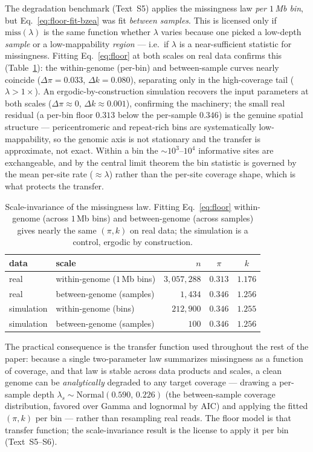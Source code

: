 \documentclass[11pt]{article}
\newcommand{\miss}{\mathrm{miss}}
\newcommand{\cov}{\lambda}                          %
\begin{document}
The degradation benchmark (Text~S5) applies the missingness law \emph{per $1$\,Mb
bin}, but Eq.~\eqref{eq:floor-fit-bzea} was fit \emph{between samples}. This is
licensed only if $\miss(\cov)$ is the same function whether $\cov$ varies because
one picked a low-depth \emph{sample} or a low-mappability \emph{region} --- i.e.\
if $\cov$ is a near-sufficient statistic for missingness. Fitting
Eq.~\eqref{eq:floor} at both scales on real data confirms this
(Table~\ref{tab:ergodicity}): the within-genome (per-bin) and between-sample
curves nearly coincide ($\Delta\pi=0.033$, $\Delta k=0.080$), separating only in
the high-coverage tail ($\cov>1\times$). An ergodic-by-construction simulation
recovers the input parameters at both scales ($\Delta\pi\approx0$,
$\Delta k\approx0.001$), confirming the machinery; the small real residual (a
per-bin floor $0.313$ below the per-sample $0.346$) is the genuine spatial
structure --- pericentromeric and repeat-rich bins are systematically
low-mappability, so the genomic axis is not stationary and the transfer is
approximate, not exact. Within a bin the ${\sim}10^{3}$--$10^{4}$ informative sites
are exchangeable, and by the central limit theorem the bin statistic is governed
by the mean per-site rate ($\approx\cov$) rather than the per-site coverage shape,
which is what protects the transfer.
\begin{table}[t]
\centering
\begin{tabular}{@{}l l r c c@{}}
\toprule
data & scale & $n$ & $\pi$ & $k$ \\
\midrule
real       & within-genome ($1$\,Mb bins) & $3{,}057{,}288$ & $0.313$ & $1.176$ \\
real       & between-genome (samples)     & $1{,}434$       & $0.346$ & $1.256$ \\
simulation & within-genome (bins)         & $212{,}900$     & $0.346$ & $1.255$ \\
simulation & between-genome (samples)     & $100$           & $0.346$ & $1.256$ \\
\bottomrule
\end{tabular}
\caption{Scale-invariance of the missingness law. Fitting
Eq.~\eqref{eq:floor} within-genome (across $1$\,Mb bins) and between-genome
(across samples) gives nearly the same $(\pi,k)$ on real data; the simulation is a
control, ergodic by construction.}
\label{tab:ergodicity}
\end{table}

The practical consequence is the transfer function used throughout the rest of the
paper: because a single two-parameter law summarizes missingness as a function of
coverage, and that law is stable across data products and scales, a clean genome
can be \emph{analytically} degraded to any target coverage --- drawing a per-sample
depth $\cov_s\sim\mathrm{Normal}(0.590,\,0.226)$ (the between-sample coverage
distribution, favored over Gamma and lognormal by AIC) and applying the fitted
$(\pi,k)$ per bin --- rather than resampling real reads. The floor model is that
transfer function; the scale-invariance result is the license to apply it per bin
(Text~S5--S6).
\end{document}
